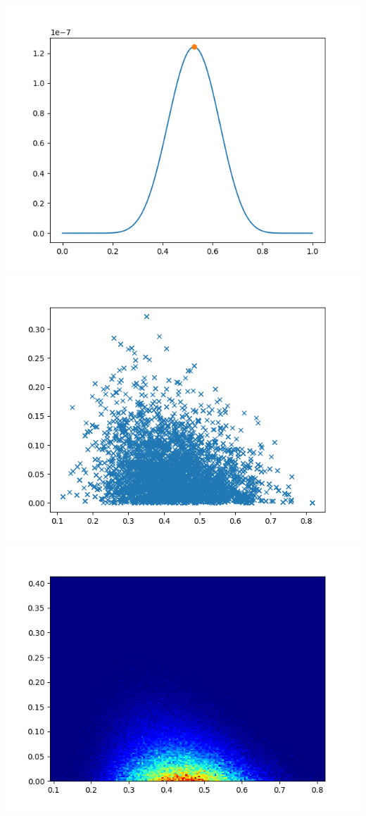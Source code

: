 \documentclass[pt12]{article}
\begin{document}
\newpage

\begin{center}
\includegraphics[scale=0.5]{hip29.png}\\
\includegraphics[scale=0.5]{sc29.png}\\
\includegraphics[scale=0.5]{den29.png}\\
\end{center}
\end{document}
